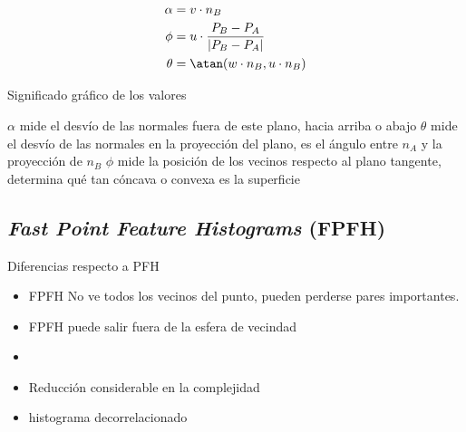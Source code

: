 \begin{align*}
	\alpha &= v \cdot n_B \\
	\phi &= u \cdot \frac{P_B - P_A}{|P_B - P_A|}\\
	\theta &= \atan(w \cdot n_B, u \cdot n_B)
\end{align*}

Significado gráfico de los valores


$\alpha$ mide el desvío de las normales fuera de este plano, hacia arriba o abajo
$\theta$ mide el desvío de las normales en la proyección del plano, es el ángulo entre $n_A$ y la proyección de $n_B$
$\phi$ mide la posición de los vecinos respecto al plano tangente, determina qué tan cóncava o convexa es la superficie



\subsection{\emph{Fast Point Feature Histograms} (FPFH)}
Diferencias respecto a PFH
\begin{itemize}
	\item FPFH No ve todos los vecinos del punto, pueden perderse pares importantes.
	\item FPFH puede salir fuera de la esfera de vecindad
	\item {}
	\item Reducción considerable en la complejidad
	\item histograma decorrelacionado
\end{itemize}

